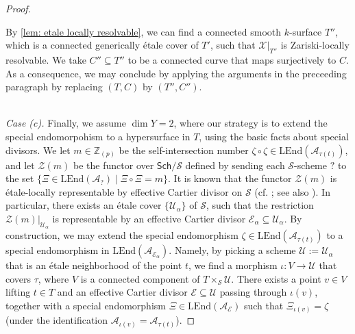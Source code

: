 \documentclass[11pt, letterpaper]{amsart}
\theoremstyle{plain}
\theoremstyle{definition}
\newcommand{\IZ}{\mathbb{Z}}
\newcommand{\<}{\langle}
\renewcommand{\>}{\rangle}
\newcommand{\sU}{\mathcal{U}}
\newcommand{\sE}{\mathcal{E}}
\newcommand{\Sch}{\mathsf{Sch}}
\newcommand{\shS}{\mathscr{S}}
\newcommand{\shZ}{\mathscr{Z}}
\newcommand{\sA}{\mathcal{A}}
\newcommand{\sX}{\mathcal{X}}
\newcommand{\LEnd}{\mathrm{LEnd}}
\begin{document}
\begin{proof}
\begin{itemize}
     	By \cref{lem: etale locally resolvable}, we can find a connected smooth $k$-surface $T''$, which is a connected generically \'etale cover of $T'$, such that $\sX|_{T''}$ is Zariski-locally resolvable. 
     	We take $C'' \subseteq T''$ to be a connected curve that maps surjectively to $C$.
     	As a consequence, we may conclude by applying the arguments in the preceeding paragraph by replacing $(T, C)$ by $(T'', C'')$. 
     \end{itemize}$~$\\
      \noindent \textit{Case (c).} Finally, we assume $\dim Y=2$, where our strategy is to extend the special endomorpohism to a hypersurface in $T$, using the basic facts about special divisors.
     	We let $m \in \IZ_{(p)}$ be the self-intersection number $\zeta\circ\zeta\in \LEnd(\sA_{\tau(t)})$, and let $\shZ(m)$ be the functor over $\mathsf{\Sch}/\shS$ defined by sending each $\shS$-scheme $?$ to the set 
     	$\{ \Xi \in \LEnd(\sA_?) \mid \Xi\circ \Xi = m \}$.
     	It is known that the functor $\shZ(m)$ is \'etale-locally representable by effective Cartier divisor on $\shS$ (cf. \cite[Prop.~4.5.8]{AGHMP}; see also \cite[Prop.~6.5.2]{HMP}). 
     	In particular, there exists an \'etale cover $\{ \sU_\alpha \}$ of $\shS$, such that the restriction $\shZ(m) |_{\sU_\alpha}$ is representable by an effective Cartier divisor $\sE_\alpha \subseteq \sU_\alpha$. 
     	By construction, we may extend the special endomorphism $\zeta\in \LEnd(\sA_{\tau(t)})$ to a special endomorphism in $\LEnd(\sA_{\sE_\alpha})$.
     	Namely, by picking a scheme $\sU := \sU_\alpha$ that is an \'etale neighborhood of the point $t$, we find a morphism $\iota : V \to \sU$ that covers $\tau$, where $V$ is a connected component of $T\times_{\shS} \sU$. 
        There exists a point $v \in V$ lifting $t \in T$ and an effective Cartier divisor $\sE \subseteq \sU$ passing through $\iota(v)$, together with a special endomorphism $\Xi \in \LEnd(\sA_\sE)$ such that $\Xi_{\iota(v)} = \zeta$ (under the identification $\sA_{\iota(v)} = \sA_{\tau(t)}$). 


\end{proof}
\end{document}
